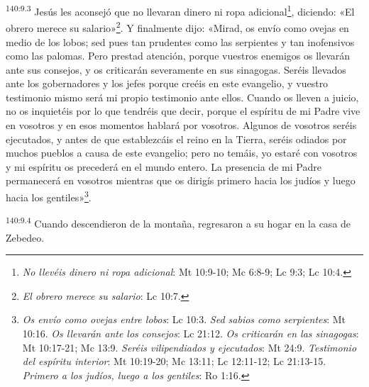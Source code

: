 \par 
\textsuperscript{140:9.3} Jesús les aconsejó que no llevaran dinero ni ropa adicional\footnote{\textit{No llevéis dinero ni ropa adicional}: Mt 10:9-10; Mc 6:8-9; Lc 9:3; Lc 10:4.}, diciendo: «El obrero merece su salario»\footnote{\textit{El obrero merece su salario}: Lc 10:7.}. Y finalmente dijo: «Mirad, os envío como ovejas en medio de los lobos; sed pues tan prudentes como las serpientes y tan inofensivos como las palomas. Pero prestad atención, porque vuestros enemigos os llevarán ante sus consejos, y os criticarán severamente en sus sinagogas. Seréis llevados ante los gobernadores y los jefes porque creéis en este evangelio, y vuestro testimonio mismo será mi propio testimonio ante ellos. Cuando os lleven a juicio, no os inquietéis por lo que tendréis que decir, porque el espíritu de mi Padre vive en vosotros y en esos momentos hablará por vosotros. Algunos de vosotros seréis ejecutados, y antes de que establezcáis el reino en la Tierra, seréis odiados por muchos pueblos a causa de este evangelio; pero no temáis, yo estaré con vosotros y mi espíritu os precederá en el mundo entero. La presencia de mi Padre permanecerá en vosotros mientras que os dirigís primero hacia los judíos y luego hacia los gentiles»\footnote{\textit{Os envío como ovejas entre lobos}: Lc 10:3. \textit{Sed sabios como serpientes}: Mt 10:16. \textit{Os llevarán ante los consejos}: Lc 21:12. \textit{Os criticarán en las sinagogas}: Mt 10:17-21; Mc 13:9. \textit{Seréis vilipendiados y ejecutados}: Mt 24:9. \textit{Testimonio del espíritu interior}: Mt 10:19-20; Mc 13:11; Lc 12:11-12; Lc 21:13-15. \textit{Primero a los judíos, luego a los gentiles}: Ro 1:16.}.

\par 
\textsuperscript{140:9.4} Cuando descendieron de la montaña, regresaron a su hogar en la casa de Zebedeo.

